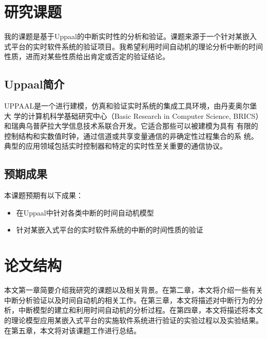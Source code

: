 \section{研究课题}
\label{sec:subject}
我的课题是基于Uppaal的中断实时性的分析和验证。课题来源于一个针对某嵌入
式平台的实时软件系统的验证项目。我希望利用时间自动机的理论分析中断的时间
性质，进而对某些性质给出肯定或否定的验证结论。

\subsection{Uppaal简介}
\label{subsec:Uppaal_intro}
UPPAAL是一个进行建模，仿真和验证实时系统的集成工具环境，由丹麦奥尔堡大
学的计算机科学基础研究中心（Basic Research in Computer Science, BRICS）和瑞典乌普萨拉大学信息技术系联合开发。它适合那些可以被建模为具有
有限的控制结构和实数值时钟，通过信道或共享变量通信的非确定性过程集合的系
统。典型的应用领域包括实时控制器和特定的实时性至关重要的通信协议。

\subsection{预期成果}
\label{subsec:expectation}
本课题预期有以下成果：
\begin{itemize}
	\item 在Uppaal中针对各类中断的时间自动机模型
	\item 针对某嵌入式平台的实时软件系统的中断的时间性质的验证
\end{itemize}

\section{论文结构}
\label{sec:structure}
本文第一章简要介绍我研究的课题以及相关背景。在第二章，本文将介绍一些有关
中断分析验证以及时间自动机的相关工作。在第三章，本文将描述对中断行为的分
析，中断模型的建立和利用时间自动机的分析过程。在第四章，本文将描述将本文
的理论模型应用某嵌入式平台的实施软件系统进行验证的实验过程以及实验结果。
在第五章，本文将对该课题工作进行总结。


